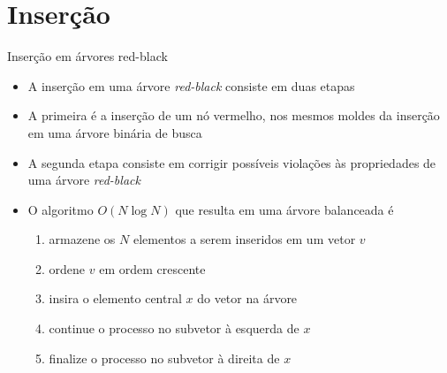 \section{Inserção}

\begin{frame}[fragile]{Inserção em árvores red-black}

    \begin{itemize}
        \item A inserção em uma árvore \textit{red-black} consiste em duas etapas

        \item A primeira é a inserção de um nó vermelho, nos mesmos moldes da inserção em
            uma árvore binária de busca

        \item A segunda etapa consiste em corrigir possíveis violações às propriedades de 
            uma árvore \textit{red-black}

        \item O algoritmo $O(N\log N)$ que resulta em uma árvore balanceada é
        \begin{enumerate}
            \item armazene os $N$ elementos a serem inseridos em um vetor $v$
            \item ordene $v$ em ordem crescente
            \item insira o elemento central $x$ do vetor na árvore
            \item continue o processo no subvetor à esquerda de $x$
            \item finalize o processo no subvetor à direita de $x$
        \end{enumerate}
    \end{itemize}

\end{frame}
